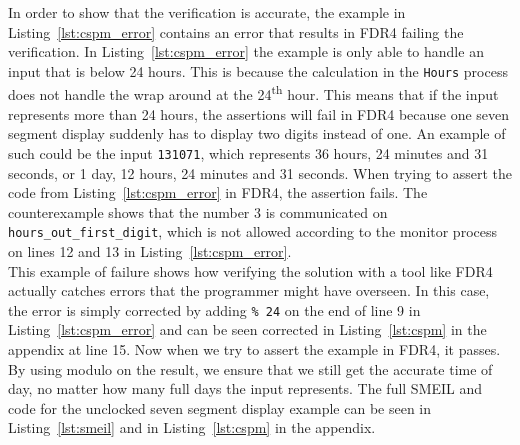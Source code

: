 In order to show that the verification is accurate, the example in Listing~\ref{lst:cspm_error} contains an error that results in FDR4 failing the verification. In Listing~\ref{lst:cspm_error} the example is only able to handle an input that is below 24 hours. This is because the calculation in the \texttt{Hours} process does not handle the wrap around at the 24\textsuperscript{th} hour. This means that if the input represents more than 24 hours, the assertions will fail in FDR4 because one seven segment display suddenly has to display two digits instead of one. An example of such could be the input \texttt{131071}, which represents 36 hours, 24 minutes and 31 seconds, or 1 day, 12 hours, 24 minutes and 31 seconds. When trying to assert the code from Listing~\ref{lst:cspm_error} in FDR4, the assertion fails. The counterexample shows that the number 3 is communicated on \texttt{hours\_out\_first\_digit}, which is not allowed according to the monitor process on lines 12 and 13 in Listing~\ref{lst:cspm_error}.\\

This example of failure shows how verifying the solution with a tool like FDR4 actually catches errors that the programmer might have overseen. In this case, the error is simply corrected by adding \texttt{\% 24} on the end of line 9 in Listing~\ref{lst:cspm_error} and can be seen corrected in Listing~\ref{lst:cspm} in the appendix at line 15. Now when we try to assert the example in FDR4, it passes. By using modulo on the result, we ensure that we still get the accurate time of day, no matter how many full days the input represents.
The full SMEIL and \cspm{} code for the unclocked seven segment display example can be seen in Listing~\ref{lst:smeil} and in Listing~\ref{lst:cspm} in the appendix.

